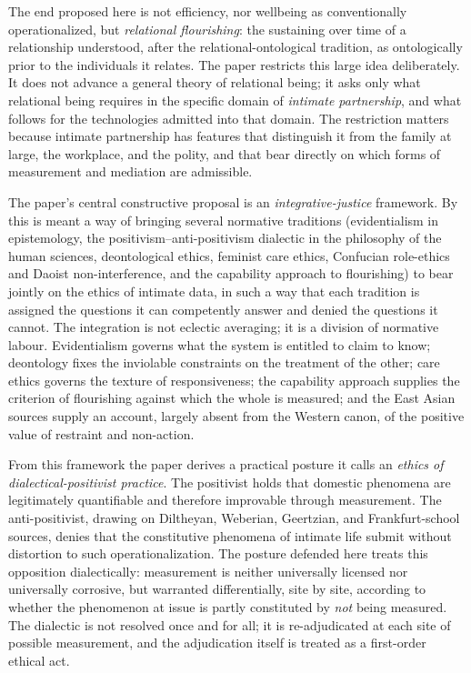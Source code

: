 The end proposed here is not efficiency, nor wellbeing as conventionally operationalized, but \emph{relational flourishing}: the sustaining over time of a relationship understood, after the relational-ontological tradition, as ontologically prior to the individuals it relates. The paper restricts this large idea deliberately. It does not advance a general theory of relational being; it asks only what relational being requires in the specific domain of \emph{intimate partnership}, and what follows for the technologies admitted into that domain. The restriction matters because intimate partnership has features that distinguish it from the family at large, the workplace, and the polity, and that bear directly on which forms of measurement and mediation are admissible.

The paper's central constructive proposal is an \emph{integrative-justice} framework. By this is meant a way of bringing several normative traditions (evidentialism in epistemology, the positivism--anti-positivism dialectic in the philosophy of the human sciences, deontological ethics, feminist care ethics, Confucian role-ethics and Daoist non-interference, and the capability approach to flourishing) to bear jointly on the ethics of intimate data, in such a way that each tradition is assigned the questions it can competently answer and denied the questions it cannot. The integration is not eclectic averaging; it is a division of normative labour. Evidentialism governs what the system is entitled to claim to know; deontology fixes the inviolable constraints on the treatment of the other; care ethics governs the texture of responsiveness; the capability approach supplies the criterion of flourishing against which the whole is measured; and the East Asian sources supply an account, largely absent from the Western canon, of the positive value of restraint and non-action.

From this framework the paper derives a practical posture it calls an \emph{ethics of dialectical-positivist practice}. The positivist holds that domestic phenomena are legitimately quantifiable and therefore improvable through measurement. The anti-positivist, drawing on Diltheyan, Weberian, Geertzian, and Frankfurt-school sources, denies that the constitutive phenomena of intimate life submit without distortion to such operationalization. The posture defended here treats this opposition dialectically: measurement is neither universally licensed nor universally corrosive, but warranted differentially, site by site, according to whether the phenomenon at issue is partly constituted by \emph{not} being measured. The dialectic is not resolved once and for all; it is re-adjudicated at each site of possible measurement, and the adjudication itself is treated as a first-order ethical act.

